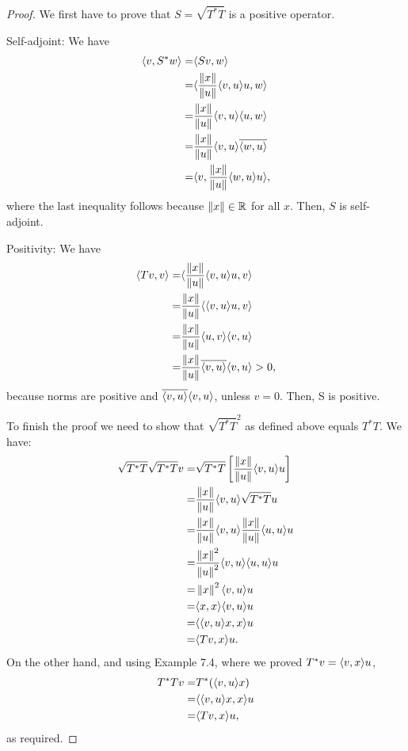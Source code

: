 \begin{proof}
 We first have to prove that $S=\sqrt{T^\ast T}$ is a positive operator.
 
 Self-adjoint: We have 
 \begin{align*}
     \langle v, S^\ast w\rangle =& \langle Sv, w\rangle\\
     =& \langle \frac{\left\lVert x\right\rVert}{\left\lVert u\right\rVert}\langle v,u\rangle u, w\rangle\\
     =& \frac{\left\lVert x\right\rVert}{\left\lVert u\right\rVert}\langle v,u\rangle\langle u, w\rangle\\
     =& \frac{\left\lVert x\right\rVert}{\left\lVert u\right\rVert}\langle v,u\rangle\overline{\langle w, u\rangle}\\
     =& \langle v,\frac{\left\lVert x\right\rVert}{\left\lVert u\right\rVert}\langle w, u\rangle u\rangle,
 \end{align*}
 where the last inequality follows because $\left\lVert x\right\rVert\in\mathbb{R}$ for all $x$. Then, $S$ is self-adjoint.

 Positivity: We have
 \begin{align*}
     \langle Tv,v\rangle =& \langle \frac{\left\lVert x\right\rVert}{\left\lVert u\right\rVert}\langle v,u\rangle u,v\rangle\\
     =& \frac{\left\lVert x\right\rVert}{\left\lVert u\right\rVert}\langle \langle v,u\rangle u,v\rangle\\
     =& \frac{\left\lVert x\right\rVert}{\left\lVert u\right\rVert}\langle u,v\rangle\langle v,u\rangle\\
     =& \frac{\left\lVert x\right\rVert}{\left\lVert u\right\rVert}\overline{\langle v,u\rangle}\langle v,u\rangle>0,
 \end{align*}
 because norms are positive and $\overline{\langle v,u\rangle}\langle v,u\rangle$, unless $v=0$. Then, S is positive.
 
 To finish the proof we need to show that $\sqrt{T^\ast T}^2$ as defined above equals $T^\ast T$. We have:
 \begin{align*}
     \sqrt{T^\ast T}\sqrt{T^\ast T}v =& \sqrt{T^\ast T}\left[\frac{\left\lVert x\right\rVert}{\left\lVert u\right\rVert}\langle v,u\rangle u\right]\\
     =& \frac{\left\lVert x\right\rVert}{\left\lVert u\right\rVert}\langle v,u\rangle\sqrt{T^\ast T}u\\
     =& \frac{\left\lVert x\right\rVert}{\left\lVert u\right\rVert}\langle v,u\rangle\frac{\left\lVert x\right\rVert}{\left\lVert u\right\rVert}\langle u,u\rangle u\\
     =& \frac{\left\lVert x\right\rVert^2}{\left\lVert u\right\rVert^2}\langle v,u\rangle\langle u,u\rangle u\\
     =& \left\lVert x\right\rVert^2\langle v,u\rangle u\\
     =& \langle x,x\rangle\langle v,u\rangle u\\
     =& \langle \langle v,u\rangle x,x\rangle u\\
     =& \langle Tv,x\rangle u.
 \end{align*}
 On the other hand, and using Example 7.4, where we proved $T^\ast v=\langle v,x\rangle u$,
 \begin{align*}
     T^\ast Tv =& T^\ast(\langle v,u\rangle x)\\
     =& \langle \langle v,u\rangle x,x\rangle u\\
     =& \langle Tv,x\rangle u,
 \end{align*}
 as required.
\end{proof}


